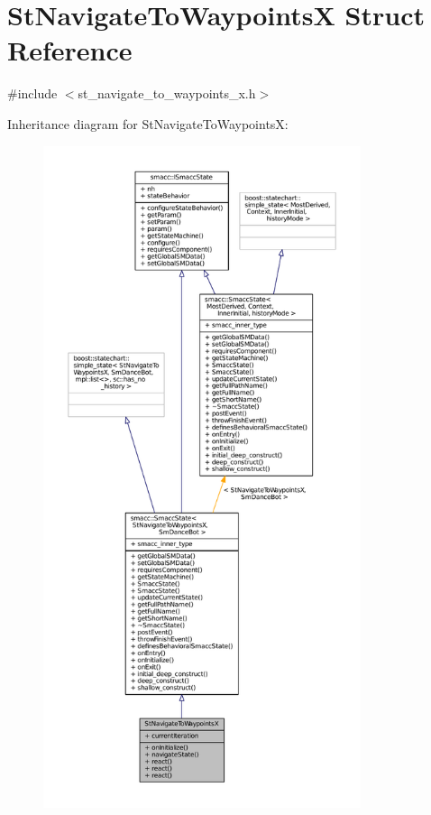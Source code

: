 \hypertarget{structStNavigateToWaypointsX}{}\section{St\+Navigate\+To\+WaypointsX Struct Reference}
\label{structStNavigateToWaypointsX}


{\ttfamily \#include $<$st\+\_\+navigate\+\_\+to\+\_\+waypoints\+\_\+x.\+h$>$}



Inheritance diagram for St\+Navigate\+To\+WaypointsX\+:
\nopagebreak
\begin{figure}[H]
\begin{center}
\leavevmode
\includegraphics[height=550pt]{structStNavigateToWaypointsX__inherit__graph}
\end{center}
\end{figure}


